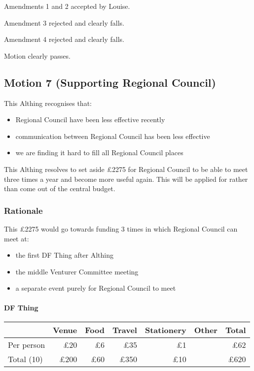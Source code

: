 \documentclass[a4paper, 11pt]{article} %
\begin{document}
Amendments 1 and 2 accepted by Louise.

Amendment 3 rejected and clearly falls.

Amendment 4 rejected and clearly falls.

Motion clearly passes.

\subsection{Motion 7 (Supporting Regional Council)}

This Althing recognises that:
\begin{itemize}
\item Regional Council have been less effective recently
\item communication between Regional Council has been less effective
\item we are finding it hard to fill all Regional Council places
\end{itemize}

This Althing resolves to set aside £2275 for Regional Council to be able to meet three times a year and become more useful again.  This will be applied for rather than come out of the central budget.

\subsubsection{Rationale}

This £2275 would go towards funding 3 times in which Regional Council can meet at:
\begin{itemize}
\item the first DF Thing after Althing
\item the middle Venturer Committee meeting
\item a separate event purely for Regional Council to meet
\end{itemize}

\paragraph{DF Thing}
\begin{center}
	\begin{tabular}[H]{l | r r r r r r}
				& Venue	& Food	& Travel	& Stationery	& Other		& Total \\ \hline
	Per person	& £20	& £6		& £35	& £1			& \textendash & £62 \\
	Total (10)		& £200	& £60	& £350	& £10		& \textendash & £620
	\end{tabular}
\end{center}
\end{document}
